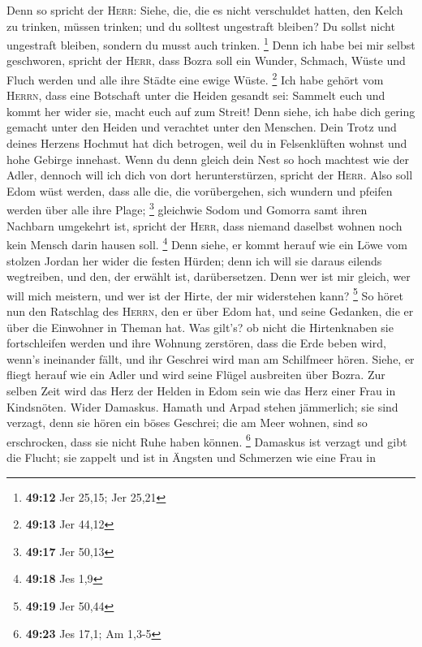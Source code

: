  Denn so spricht der \textsc{Herr}: Siehe, die, die es
nicht verschuldet hatten, den Kelch zu trinken, müssen trinken; und du
solltest ungestraft bleiben? Du sollst nicht ungestraft bleiben, sondern
du musst auch trinken. \footnote{\textbf{49:12} Jer 25,15; Jer 25,21}
 Denn ich habe bei mir selbst geschworen, spricht der
\textsc{Herr}, dass Bozra soll ein Wunder, Schmach, Wüste und Fluch
werden und alle ihre Städte eine ewige Wüste. \footnote{\textbf{49:13}
  Jer 44,12}  Ich habe gehört vom \textsc{Herrn}, dass
eine Botschaft unter die Heiden gesandt sei: Sammelt euch und kommt her
wider sie, macht euch auf zum Streit!  Denn siehe, ich
habe dich gering gemacht unter den Heiden und verachtet unter den
Menschen.  Dein Trotz und deines Herzens Hochmut hat dich
betrogen, weil du in Felsenklüften wohnst und hohe Gebirge innehast.
Wenn du denn gleich dein Nest so hoch machtest wie der Adler, dennoch
will ich dich von dort herunterstürzen, spricht der \textsc{Herr}.
 Also soll Edom wüst werden, dass alle die, die
vorübergehen, sich wundern und pfeifen werden über alle ihre Plage;
\footnote{\textbf{49:17} Jer 50,13}  gleichwie Sodom und
Gomorra samt ihren Nachbarn umgekehrt ist, spricht der \textsc{Herr},
dass niemand daselbst wohnen noch kein Mensch darin hausen soll.
\footnote{\textbf{49:18} Jes 1,9}  Denn siehe, er kommt
herauf wie ein Löwe vom stolzen Jordan her wider die festen Hürden; denn
ich will sie daraus eilends wegtreiben, und den, der erwählt ist,
darübersetzen. Denn wer ist mir gleich, wer will mich meistern, und wer
ist der Hirte, der mir widerstehen kann? \footnote{\textbf{49:19} Jer
  50,44}  So höret nun den Ratschlag des \textsc{Herrn},
den er über Edom hat, und seine Gedanken, die er über die Einwohner in
Theman hat. Was gilt's? ob nicht die Hirtenknaben sie fortschleifen
werden und ihre Wohnung zerstören,  dass die Erde beben
wird, wenn's ineinander fällt, und ihr Geschrei wird man am Schilfmeer
hören.  Siehe, er fliegt herauf wie ein Adler und wird
seine Flügel ausbreiten über Bozra. Zur selben Zeit wird das Herz der
Helden in Edom sein wie das Herz einer Frau in Kindsnöten.
 Wider Damaskus. Hamath und Arpad stehen jämmerlich; sie
sind verzagt, denn sie hören ein böses Geschrei; die am Meer wohnen,
sind so erschrocken, dass sie nicht Ruhe haben können. \footnote{\textbf{49:23}
  Jes 17,1; Am 1,3-5}  Damaskus ist verzagt und gibt die
Flucht; sie zappelt und ist in Ängsten und Schmerzen wie eine Frau in
